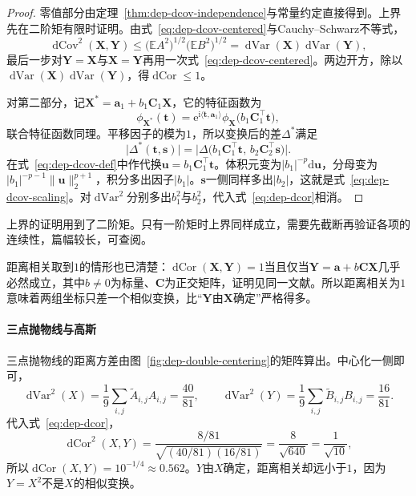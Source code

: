 \begin{proof}
零值部分由定理~\ref{thm:dep-dcov-independence}与常量约定直接得到。上界先在二阶矩有限时证明。由式~\eqref{eq:dep-dcov-centered}与Cauchy--Schwarz不等式，
\[
  \operatorname{dCov}^{2}(\bm{X},\bm{Y})\leq\bigl(\mathbb{E}A^{2}\bigr)^{1/2}\bigl(\mathbb{E}B^{2}\bigr)^{1/2}=\operatorname{dVar}(\bm{X})\operatorname{dVar}(\bm{Y}),
\]
最后一步对$\bm{Y}=\bm{X}$与$\bm{X}=\bm{Y}$再用一次式~\eqref{eq:dep-dcov-centered}。两边开方，除以$\operatorname{dVar}(\bm{X})\operatorname{dVar}(\bm{Y})$，得$\operatorname{dCor}\leq1$。

对第二部分，记$\bm{X}^{*}=\bm{a}_1+b_1\bm{C}_1\bm{X}$，它的特征函数为
\[
  \phi_{\bm{X}^{*}}(\bm{t})=\mathrm{e}^{\mathrm{i}\langle\bm{t},\bm{a}_1\rangle}\phi_{\bm{X}}\bigl(b_1\bm{C}_1^{\top}\bm{t}\bigr),
\]
联合特征函数同理。平移因子的模为$1$，所以变换后的差$\Delta^{*}$满足
\[
  \lvert\Delta^{*}(\bm{t},\bm{s})\rvert=\bigl\lvert\Delta\bigl(b_1\bm{C}_1^{\top}\bm{t},\,b_2\bm{C}_2^{\top}\bm{s}\bigr)\bigr\rvert .
\]
在式~\eqref{eq:dep-dcov-def}中作代换$\bm{u}=b_1\bm{C}_1^{\top}\bm{t}$。体积元变为$\lvert b_1\rvert^{-p}\mathrm{d}\bm{u}$，分母变为$\lvert b_1\rvert^{-p-1}\lVert\bm{u}\rVert_2^{p+1}$，积分多出因子$\lvert b_1\rvert$。$\bm{s}$一侧同样多出$\lvert b_2\rvert$，这就是式~\eqref{eq:dep-dcov-scaling}。对$\operatorname{dVar}^{2}$分别多出$b_1^{2}$与$b_2^{2}$，代入式~\eqref{eq:dep-dcor}相消。
\end{proof}

上界的证明用到了二阶矩。只有一阶矩时上界同样成立，需要先截断再验证各项的连续性，篇幅较长，可查阅。

距离相关取到$1$的情形也已清楚：$\operatorname{dCor}(\bm{X},\bm{Y})=1$当且仅当$\bm{Y}=\bm{a}+b\bm{C}\bm{X}$几乎必然成立，其中$b\neq0$为标量、$\bm{C}$为正交矩阵，证明见同一文献。所以距离相关为$1$意味着两组坐标只差一个相似变换，比“$\bm{Y}$由$\bm{X}$确定”严格得多。

\paragraph{三点抛物线与高斯}
三点抛物线的距离方差由图~\ref{fig:dep-double-centering}的矩阵算出。中心化一侧即可，
\[
  \operatorname{dVar}^{2}(X)=\frac19\sum_{i,j}\tilde{A}_{i,j}A_{i,j}=\frac{40}{81},\qquad \operatorname{dVar}^{2}(Y)=\frac19\sum_{i,j}\tilde{B}_{i,j}B_{i,j}=\frac{16}{81}.
\]代入式~\eqref{eq:dep-dcor}，
\[
  \operatorname{dCor}^{2}(X,Y)=\frac{8/81}{\sqrt{(40/81)(16/81)}}=\frac{8}{\sqrt{640}}=\frac{1}{\sqrt{10}},
\]
所以$\operatorname{dCor}(X,Y)=10^{-1/4}\approx0.562$。$Y$由$X$确定，距离相关却远小于$1$，因为$Y=X^{2}$不是$X$的相似变换。

